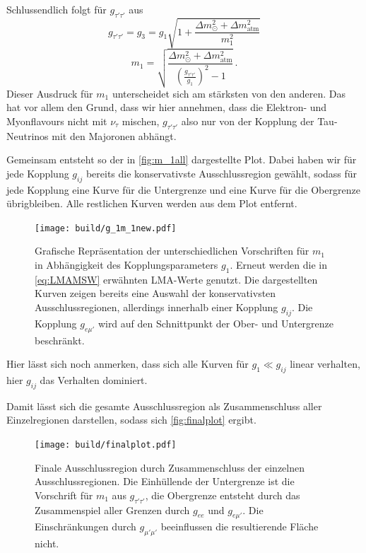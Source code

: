 Schlussendlich folgt für $g_{\tau' \tau'}$ aus
\begin{equation*}
    g_{\tau' \tau'} = g_3 = g_1 \sqrt{1 + \frac{\Delta m^2_\odot + \Delta m^2_\text{atm}}{m^2_1}}
\end{equation*}
\begin{equation}
    m_1 = \sqrt{\frac{\Delta m^2_\odot + \Delta m^2_\text{atm}}{\left(\frac{g_{\tau' \tau'}}{g_1}\right)^2 - 1}} \,.
    \label{eq:g_tautau}
\end{equation}
Dieser Ausdruck für $m_1$ unterscheidet sich am stärksten von den anderen.
Das hat vor allem den Grund, dass wir hier annehmen, dass die Elektron- und Myonflavours nicht mit $\nu_\tau$ mischen, $g_{\tau' \tau'}$ also nur von der Kopplung der Tau-Neutrinos mit den Majoronen abhängt.

Gemeinsam entsteht so der in \autoref{fig:m_1all} dargestellte Plot.
Dabei haben wir für jede Kopplung $g_{i j}$ bereits die konservativste Ausschlussregion gewählt, sodass für jede Kopplung eine Kurve für die Untergrenze und eine Kurve für die Obergrenze übrigbleiben.
Alle restlichen Kurven werden aus dem Plot entfernt. 
\begin{figure}[H]
    \centering
    \texttt{[image: build/g\_1m\_1new.pdf]}
    \caption{Grafische Repräsentation der unterschiedlichen Vorschriften für $m_1$ in Abhängigkeit des Kopplungsparameters $g_1$. Erneut werden die in \eqref{eq:LMAMSW} erwähnten LMA-Werte genutzt.
            Die dargestellten Kurven zeigen bereits eine Auswahl der konservativsten Ausschlussregionen, allerdings innerhalb einer Kopplung $g_{i j}$. 
            Die Kopplung $g_{e \mu'}$ wird auf den Schnittpunkt der Ober- und Untergrenze beschränkt.}
    \label{fig:m_1all}
\end{figure}
Hier lässt sich noch anmerken, dass sich alle Kurven für $g_1 \ll g_{i j}$ linear verhalten, hier $g_{i j}$ das Verhalten dominiert.

Damit lässt sich die gesamte Ausschlussregion als Zusammenschluss aller Einzelregionen darstellen, sodass sich \autoref{fig:finalplot} ergibt.
\begin{figure}[H]
    \centering
    \texttt{[image: build/finalplot.pdf]}
    \caption{Finale Ausschlussregion durch Zusammenschluss der einzelnen Ausschlussregionen. Die Einhüllende der Untergrenze ist die Vorschrift für $m_1$ aus $g_{\tau' \tau'}$, 
            die Obergrenze entsteht durch das Zusammenspiel aller Grenzen durch $g_{ee}$ und $g_{e \mu'}$. Die Einschränkungen durch $g_{\mu' \mu'}$ beeinflussen die resultierende Fläche nicht.}
    \label{fig:finalplot}
\end{figure}


